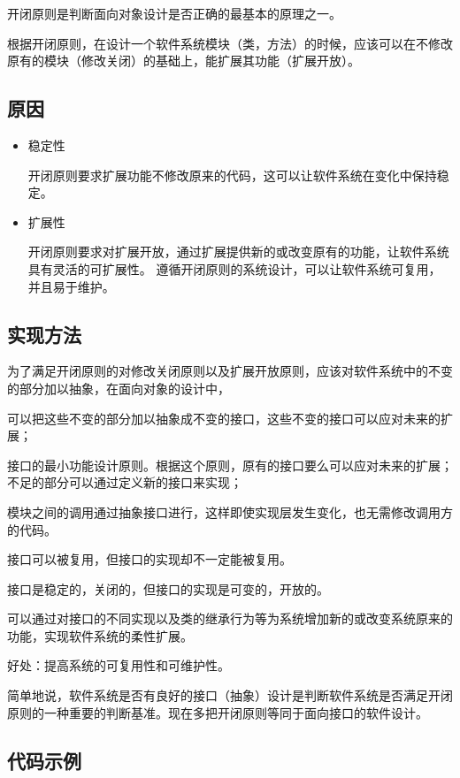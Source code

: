 开闭原则是判断面向对象设计是否正确的最基本的原理之一。

根据开闭原则，在设计一个软件系统模块（类，方法）的时候，应该可以在不修改原有的模块（修改关闭）的基础上，能扩展其功能（扩展开放）。

\subsection{原因}

\begin{itemize}
\item{稳定性}

开闭原则要求扩展功能不修改原来的代码，这可以让软件系统在变化中保持稳定。

\item{扩展性}

开闭原则要求对扩展开放，通过扩展提供新的或改变原有的功能，让软件系统具有灵活的可扩展性。
遵循开闭原则的系统设计，可以让软件系统可复用，并且易于维护。
\end{itemize}

\subsection{实现方法}

为了满足开闭原则的对修改关闭原则以及扩展开放原则，应该对软件系统中的不变的部分加以抽象，在面向对象的设计中，

可以把这些不变的部分加以抽象成不变的接口，这些不变的接口可以应对未来的扩展；

接口的最小功能设计原则。根据这个原则，原有的接口要么可以应对未来的扩展；不足的部分可以通过定义新的接口来实现；

模块之间的调用通过抽象接口进行，这样即使实现层发生变化，也无需修改调用方的代码。

接口可以被复用，但接口的实现却不一定能被复用。

接口是稳定的，关闭的，但接口的实现是可变的，开放的。

可以通过对接口的不同实现以及类的继承行为等为系统增加新的或改变系统原来的功能，实现软件系统的柔性扩展。

好处：提高系统的可复用性和可维护性。

简单地说，软件系统是否有良好的接口（抽象）设计是判断软件系统是否满足开闭原则的一种重要的判断基准。现在多把开闭原则等同于面向接口的软件设计。

\subsection{代码示例}


